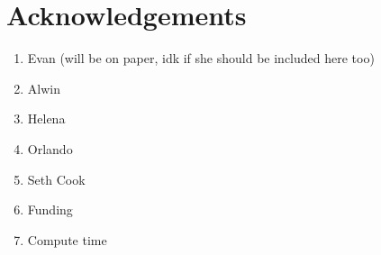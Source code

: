 \section{Acknowledgements}

\begin{enumerate}
    \item Evan (will be on paper, idk if she should be included here too)
    \item Alwin
    \item Helena
    \item Orlando
    \item Seth Cook
    \item Funding
    \item Compute time
\end{enumerate}